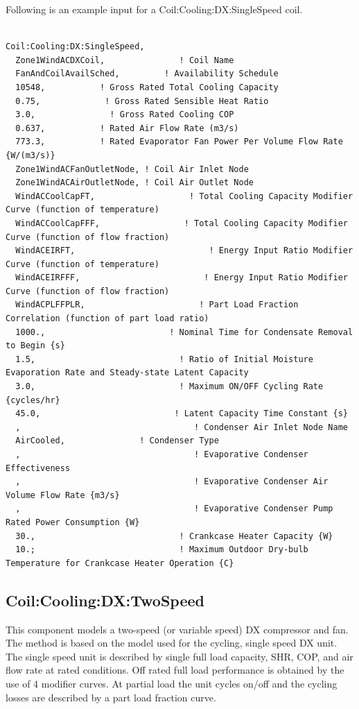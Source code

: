 Following is an example input for a Coil:Cooling:DX:SingleSpeed coil.

\begin{lstlisting}

Coil:Cooling:DX:SingleSpeed,
  Zone1WindACDXCoil,               ! Coil Name
  FanAndCoilAvailSched,         ! Availability Schedule
  10548,           ! Gross Rated Total Cooling Capacity
  0.75,             ! Gross Rated Sensible Heat Ratio
  3.0,               ! Gross Rated Cooling COP
  0.637,           ! Rated Air Flow Rate (m3/s)
  773.3,           ! Rated Evaporator Fan Power Per Volume Flow Rate {W/(m3/s)}
  Zone1WindACFanOutletNode, ! Coil Air Inlet Node
  Zone1WindACAirOutletNode, ! Coil Air Outlet Node
  WindACCoolCapFT,                   ! Total Cooling Capacity Modifier Curve (function of temperature)
  WindACCoolCapFFF,                 ! Total Cooling Capacity Modifier Curve (function of flow fraction)
  WindACEIRFT,                           ! Energy Input Ratio Modifier Curve (function of temperature)
  WindACEIRFFF,                         ! Energy Input Ratio Modifier Curve (function of flow fraction)
  WindACPLFFPLR,                       ! Part Load Fraction Correlation (function of part load ratio)
  1000.,                         ! Nominal Time for Condensate Removal to Begin {s}
  1.5,                             ! Ratio of Initial Moisture Evaporation Rate and Steady-state Latent Capacity
  3.0,                             ! Maximum ON/OFF Cycling Rate {cycles/hr}
  45.0,                           ! Latent Capacity Time Constant {s}
  ,                                   ! Condenser Air Inlet Node Name
  AirCooled,               ! Condenser Type
  ,                                   ! Evaporative Condenser Effectiveness
  ,                                   ! Evaporative Condenser Air Volume Flow Rate {m3/s}
  ,                                   ! Evaporative Condenser Pump Rated Power Consumption {W}
  30.,                             ! Crankcase Heater Capacity {W}
  10.;                             ! Maximum Outdoor Dry-bulb Temperature for Crankcase Heater Operation {C}
\end{lstlisting}

\subsection{Coil:Cooling:DX:TwoSpeed}\label{coilcoolingdxtwospeed}

This component models a two-speed (or variable speed) DX compressor and fan. The method is based on the model used for the cycling, single speed DX unit. The single speed unit is described by single full load capacity, SHR, COP, and air flow rate at rated conditions. Off rated full load performance is obtained by the use of 4 modifier curves. At partial load the unit cycles on/off and the cycling losses are described by a part load fraction curve.


